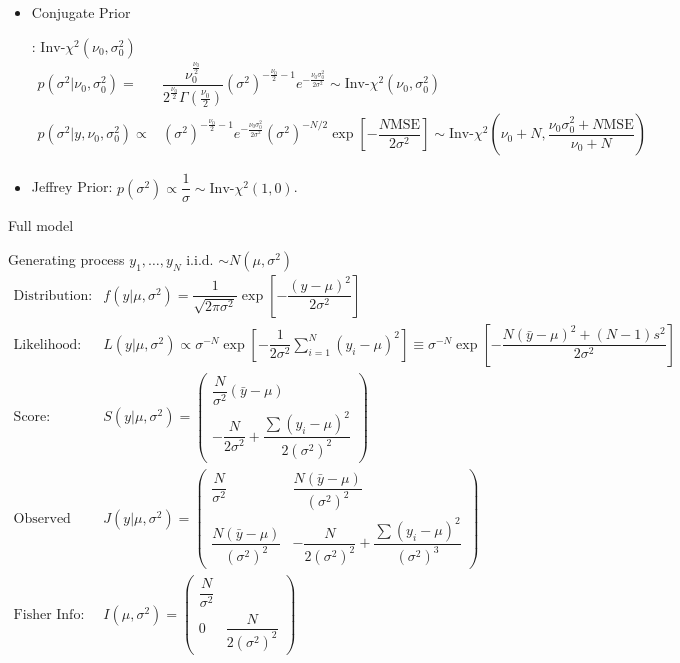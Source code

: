 \begin{itemize}[topsep=2pt,itemsep=0pt]
    \item \hypertarget{NormalWithMeanConjugate}{Conjugate Prior}: $ \mathrm{Inv } $-$ \chi^2(\nu _0, \sigma _0^2) $
    \begin{align}
        p(\sigma ^2|\nu _0,\sigma _0^2)=& \dfrac{\nu _0^{\frac{\nu _0}{2}}}{2^{\frac{\nu _0}{2}}\Gamma (\frac{\nu _0}{2})}(\sigma ^2)^{-\frac{\nu _0}{2}-1}e^{-\frac{\nu _0\sigma _0^2}{2\sigma ^2}}\sim \mathrm{ Inv }\text{-}\chi^2(\nu _0,\sigma _0^2)   \\
        p(\sigma ^2|y,\nu _0,\sigma _0^2)\propto&(\sigma ^2)^{-\frac{\nu _0}{2}-1}e^{-\frac{\nu _0\sigma _0^2}{2\sigma ^2}}(\sigma ^2)^{-N/2}\exp\left[ -\dfrac{ N\mathrm{ MSE }  }{ 2\sigma ^2 }  \right]\sim \mathrm{ Inv }\text{-}\chi^2\left( \nu _0+N, \dfrac{ \nu _0\sigma _0^2 + N\mathrm{ MSE }  }{ \nu _0+N }  \right)
    \end{align}
    
    
    \item Jeffrey Prior: $ p(\sigma ^2 )\propto \dfrac{ 1 }{ \sigma  }\sim  \mathrm{ Inv }\text{-}\chi^2(1,0) $.
\end{itemize}


\begin{point}
    Full model
\end{point}

Generating process $ y_1,\ldots,y_N $ i.i.d. $ \sim N(\mu  ,\sigma ^2) $
\begin{align}
    \text{Distribution:}&f(y|\mu ,\sigma ^2  )=\dfrac{1}{\sqrt{2\pi\sigma ^2}}\exp\left[ -\dfrac{(y-\mu  )^2}{2\sigma ^2} \right]\\
    \text{Likelihood:}&L(y|\mu ,\sigma ^2)\propto \sigma^{-N} \exp\left[ -\dfrac{1}{2\sigma ^2}\sum_{i=1}^N (y_i-\mu )^2 \right]\equiv \sigma^{-N} \exp\left[ -\dfrac{N(\bar{y}-\mu )^2+(N-1)s^2}{2\sigma ^2}   \right] \\
    \text{Score:}&S(y|\mu ,\sigma ^2)= \begin{pmatrix}
        \dfrac{N}{\sigma ^2}(\bar{y}-\mu )\\
        -\dfrac{N}{2\sigma ^2}+\dfrac{\sum (y_i-\mu )^2}{2(\sigma ^2)^2}
    \end{pmatrix}\\
    \text{Observed Info:}&J(y|\mu ,\sigma ^2)= \begin{pmatrix}
        \dfrac{N}{\sigma ^2}&\dfrac{N(\bar{y}-\mu )}{(\sigma ^2)^2}\\
        \dfrac{N(\bar{y}-\mu )}{(\sigma ^2)^2}&-\dfrac{N }{2(\sigma ^2)^2}+\dfrac{\sum (y_i-\mu )^2}{(\sigma ^2)^3}
    \end{pmatrix}\\
    \text{Fisher Info:}&I(\mu ,\sigma^2 )=\begin{pmatrix}
        \dfrac{N}{\sigma ^2}&\\
        0&\dfrac{N}{2(\sigma ^2)^2}
    \end{pmatrix}
\end{align}


